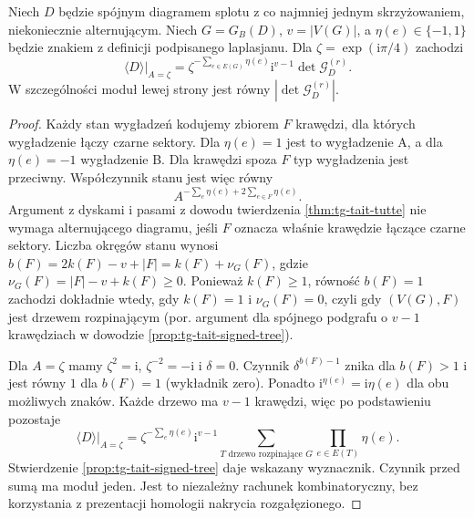 \begin{stwierdzenie}
\label{prop:tg-tait-bracket-det}
Niech $D$ będzie spójnym diagramem splotu z co najmniej
jednym skrzyżowaniem, niekoniecznie alternującym.
Niech $G=G_B(D)$, $v=|V(G)|$, a $\eta(e)\in\{-1,1\}$
będzie znakiem z definicji podpisanego laplasjanu.
Dla $\zeta=\exp(\mathrm i\pi/4)$ zachodzi
\[
 \langle D\rangle\big|_{A=\zeta}
 =\zeta^{-\sum_{e\in E(G)}\eta(e)}
 \mathrm i^{v-1}\det\mathcal G_D^{(r)}.
\]
W szczególności moduł lewej strony jest równy
$|\det\mathcal G_D^{(r)}|$.
\end{stwierdzenie}

\begin{proof}
Każdy stan wygładzeń kodujemy zbiorem $F$ krawędzi,
dla których wygładzenie łączy czarne sektory.
Dla $\eta(e)=1$ jest to wygładzenie A, a dla
$\eta(e)=-1$ wygładzenie B. Dla krawędzi spoza $F$
typ wygładzenia jest przeciwny. Współczynnik stanu
jest więc równy
\[
 A^{-\sum_e\eta(e)+2\sum_{e\in F}\eta(e)}.
\]
Argument z dyskami i pasami z dowodu twierdzenia
\ref{thm:tg-tait-tutte} nie wymaga alternującego
diagramu, jeśli $F$ oznacza właśnie krawędzie
łączące czarne sektory. Liczba okręgów stanu
wynosi $b(F)=2k(F)-v+|F|=k(F)+\nu_G(F)$,
gdzie $\nu_G(F)=|F|-v+k(F)\geq0$.
Ponieważ $k(F)\geq1$, równość $b(F)=1$ zachodzi
dokładnie wtedy, gdy $k(F)=1$ i $\nu_G(F)=0$,
czyli gdy $(V(G),F)$ jest drzewem rozpinającym
(por. argument dla spójnego podgrafu o $v-1$
krawędziach w dowodzie \ref{prop:tg-tait-signed-tree}).

Dla $A=\zeta$ mamy $\zeta^2=\mathrm i$,
$\zeta^{-2}=-\mathrm i$ i $\delta=0$.
Czynnik $\delta^{b(F)-1}$ znika dla $b(F)>1$
i jest równy $1$ dla $b(F)=1$ (wykładnik zero).
Ponadto $\mathrm i^{\eta(e)}=\mathrm i\eta(e)$
dla obu możliwych znaków. Każde drzewo ma $v-1$
krawędzi, więc po podstawieniu pozostaje
\[
 \langle D\rangle\big|_{A=\zeta}
 =\zeta^{-\sum_e\eta(e)}\mathrm i^{v-1}
   \sum_{T\text{ drzewo rozpinające }G}
   \prod_{e\in E(T)}\eta(e).
\]
Stwierdzenie \ref{prop:tg-tait-signed-tree}
daje wskazany wyznacznik. Czynnik przed sumą
ma moduł jeden. Jest to niezależny rachunek
kombinatoryczny, bez korzystania z prezentacji
homologii nakrycia rozgałęzionego.
\end{proof}

